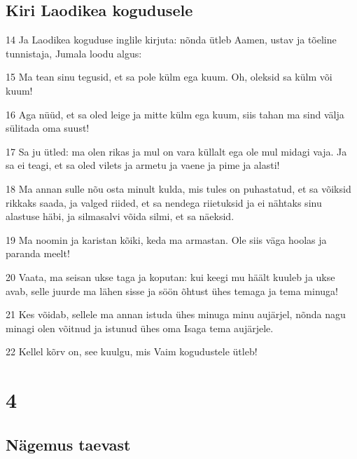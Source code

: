 \section*{Kiri Laodikea kogudusele}

\par 14 Ja Laodikea koguduse inglile kirjuta: nõnda ütleb Aamen, ustav ja tõeline tunnistaja, Jumala loodu algus:
\par 15 Ma tean sinu tegusid, et sa pole külm ega kuum. Oh, oleksid sa külm või kuum!
\par 16 Aga nüüd, et sa oled leige ja mitte külm ega kuum, siis tahan ma sind välja sülitada oma suust!
\par 17 Sa ju ütled: ma olen rikas ja mul on vara küllalt ega ole mul midagi vaja. Ja sa ei teagi, et sa oled vilets ja armetu ja vaene ja pime ja alasti!
\par 18 Ma annan sulle nõu osta minult kulda, mis tules on puhastatud, et sa võiksid rikkaks saada, ja valged riided, et sa nendega riietuksid ja ei nähtaks sinu alastuse häbi, ja silmasalvi võida silmi, et sa näeksid.
\par 19 Ma noomin ja karistan kõiki, keda ma armastan. Ole siis väga hoolas ja paranda meelt!
\par 20 Vaata, ma seisan ukse taga ja koputan: kui keegi mu häält kuuleb ja ukse avab, selle juurde ma lähen sisse ja söön õhtust ühes temaga ja tema minuga!
\par 21 Kes võidab, sellele ma annan istuda ühes minuga minu aujärjel, nõnda nagu minagi olen võitnud ja istunud ühes oma Isaga tema aujärjele.
\par 22 Kellel kõrv on, see kuulgu, mis Vaim kogudustele ütleb!


\chapter{4}

\section*{Nägemus taevast}


